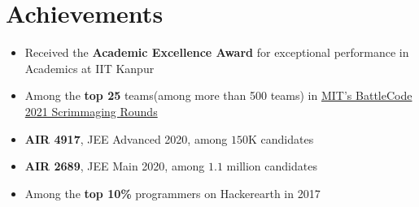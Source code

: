 \section*{\sc Achievements}
\vspace{-2mm}
\hrulefill
\vspace{1mm}

\begin{itemize}
    \item Received the \textbf{Academic Excellence Award} for exceptional performance in Academics at IIT Kanpur
    \item Among the \textbf{top 25} teams(among more than 500 teams) in  \href{https://github.com/abhishekshree/BattleCode}{MIT's BattleCode 2021 Scrimmaging Rounds}
    \item \textbf{AIR 4917}, JEE Advanced 2020, among $150$K candidates 
    \item \textbf{AIR 2689}, JEE Main 2020, among $1.1$ million candidates
    \item Among the \textbf{top 10\%} programmers on Hackerearth in 2017
\end{itemize}
